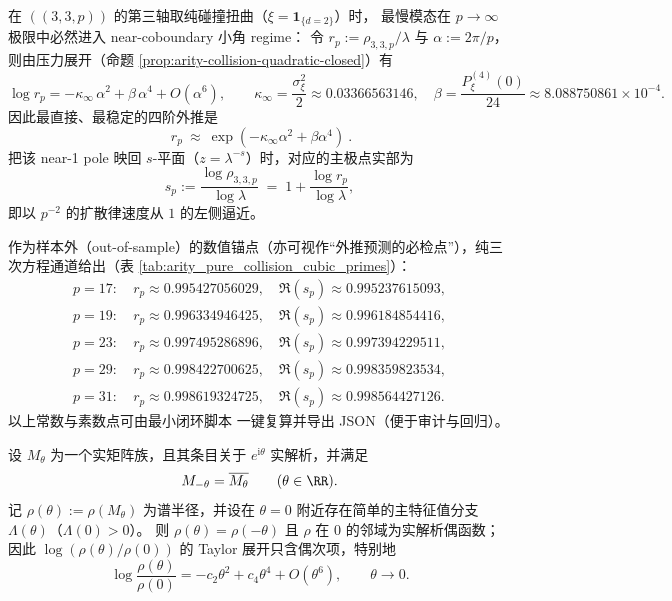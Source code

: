 \begin{remark}\label{rem:arity-335-near-coboundary-scaling}
在 \(((3,3,p))\) 的第三轴取纯碰撞扭曲（\(\xi=\mathbf{1}_{\{d=2\}}\)）时，
最慢模态在 \(p\to\infty\) 极限中必然进入 near-coboundary 小角 regime：
令
\(
r_p:=\rho_{3,3,p}/\lambda
\)
与 \(\alpha:=2\pi/p\)，则由压力展开（命题 \ref{prop:arity-collision-quadratic-closed}）有
\[
\log r_p=-\kappa_\infty\,\alpha^2+\beta\,\alpha^4+O(\alpha^6),
\qquad
\kappa_\infty=\frac{\sigma_\xi^2}{2}\approx 0.03366563146,
\quad
\beta=\frac{P_\xi^{(4)}(0)}{24}\approx 8.088750861\times 10^{-4}.
\]
因此最直接、最稳定的四阶外推是
\[
\boxed{\ r_p\ \approx\ \exp(-\kappa_\infty\alpha^2+\beta\alpha^4)\ }.
\]
把该 near-1 pole 映回 \(s\)-平面（\(z=\lambda^{-s}\)）时，对应的主极点实部为
\[
s_p:=\frac{\log\rho_{3,3,p}}{\log\lambda}
\;=\;
1+\frac{\log r_p}{\log\lambda},
\]
即以 \(p^{-2}\) 的扩散律速度从 \(1\) 的左侧逼近。
\par
作为样本外（out-of-sample）的数值锚点（亦可视作“外推预测的必检点”），纯三次方程通道给出（表 \ref{tab:arity_pure_collision_cubic_primes}）：
\[
\begin{aligned}
p=17:&\ r_p\approx 0.995427056029,\quad \Re(s_p)\approx 0.995237615093,\\
p=19:&\ r_p\approx 0.996334946425,\quad \Re(s_p)\approx 0.996184854416,\\
p=23:&\ r_p\approx 0.997495286896,\quad \Re(s_p)\approx 0.997394229511,\\
p=29:&\ r_p\approx 0.998422700625,\quad \Re(s_p)\approx 0.998359823534,\\
p=31:&\ r_p\approx 0.998619324725,\quad \Re(s_p)\approx 0.998564427126.
\end{aligned}
\]
以上常数与素数点可由最小闭环脚本  一键复算并导出 JSON（便于审计与回归）。
\end{remark}


\begin{remark}[单位圆扭曲的偶性与无三次项]\label{lem:unit-circle-evenness}
设 $M_\theta$ 为一个实矩阵族，且其条目关于 $e^{\mathrm{i}\theta}$ 实解析，并满足
\[
M_{-\theta}=\overline{M_\theta}\qquad(\theta\in\RR).
\]
记 $\rho(\theta):=\rho(M_\theta)$ 为谱半径，并设在 $\theta=0$ 附近存在简单的主特征值分支 $\Lambda(\theta)$（$\Lambda(0)>0$）。
则 \(\rho(\theta)=\rho(-\theta)\) 且 \(\rho\) 在 \(0\) 的邻域为实解析偶函数；因此 \(\log(\rho(\theta)/\rho(0))\) 的 Taylor 展开只含偶次项，特别地
\[
\log\frac{\rho(\theta)}{\rho(0)}=-c_2\theta^2+c_4\theta^4+O(\theta^6),
\qquad \theta\to 0.
\]
\end{remark}


